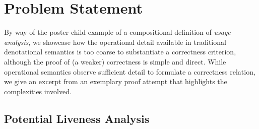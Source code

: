 \section{Problem Statement}
\label{sec:problem}

By way of the poster child example of a compositional definition of \emph{usage
analysis}, we showcase how the operational detail available in traditional
denotational semantics is too coarse to substantiate a correctness criterion,
although the proof of (a weaker) correctness is simple and direct.
While operational semantics observe sufficient detail to formulate a correctness
relation, we give an excerpt from an exemplary proof attempt that highlights the
complexities involved.


%
%

\subsection{Potential Liveness Analysis}

